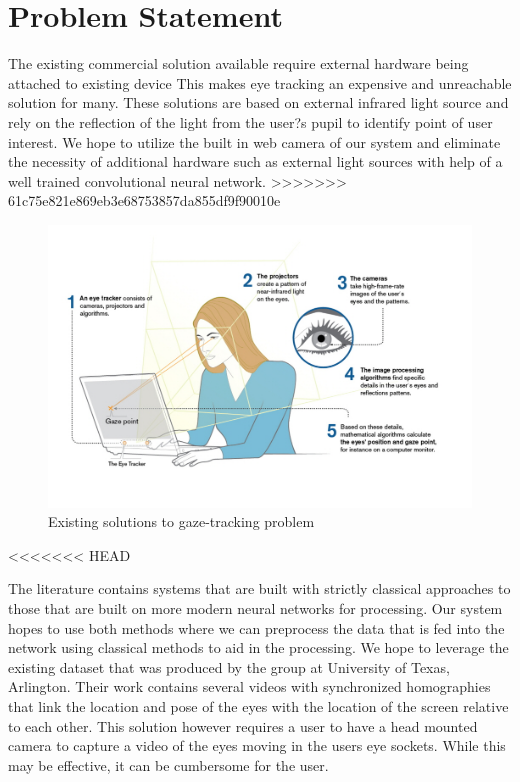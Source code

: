 \documentclass[10pt,twocolumn,letterpaper]{article}
\begin{document}
\section{Problem Statement}
The existing commercial solution available require external hardware
being attached to existing device\cite{eyetrackerlist}\cite{tobii_1} This makes eye tracking an
expensive and unreachable solution for many. These solutions are based
on external infrared light source and rely on the reflection of the
light from the user?s pupil to identify point of user interest. We hope to
utilize the built in web camera of our system and eliminate the necessity
of additional hardware such as external light sources with help of a
well trained convolutional neural network.
>>>>>>> 61c75e821e869eb3e68753857da855df9f90010e

\begin{figure}
  \begin{center}
    \includegraphics[width=\linewidth]{existing_solutions}
  \end{center}
  \caption{Existing solutions to gaze-tracking problem}
  \label{fig:existsol}
  \end{figure}

<<<<<<< HEAD

The literature contains systems that are built with strictly classical
approaches to those that are built on more modern neural networks for
processing\cite{krafka}\cite{mcmurrough}\cite{weidenbacher}\cite{baluja}\cite{cazzato}\cite{li}. Our
system hopes to use both methods where we can preprocess the data that
is fed into the network using classical methods to aid in the
processing. We hope to leverage the existing dataset that was produced
by the group at University of Texas, Arlington\cite{mcmurrough}. Their
work contains several videos with synchronized homographies that link
the location and pose of the eyes with the location of the screen
relative to each other. This solution however requires a user to have
a head mounted camera to capture a video of the eyes moving in the
users eye sockets. While this may be effective, it can be cumbersome
for the user.
\end{document}
